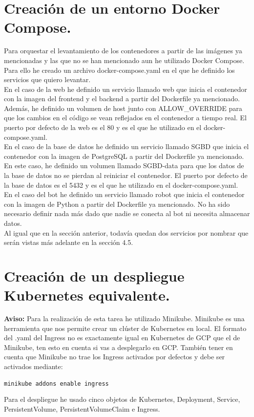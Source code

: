 \documentclass{report}
\begin{document}
        \section{Creación de un entorno Docker Compose.}
            Para orquestar el levantamiento de los contenedores a partir de las imágenes ya mencionadas y las que no se han mencionado aun he utilizado Docker Compose.
            Para ello he creado un archivo docker-compose.yaml en el que he definido los servicios que quiero levantar.\\

            En el caso de la web he definido un servicio llamado web que inicia el contenedor con la imagen del frontend y el backend a partir del Dockerfile ya mencionado.
            Además, he definido un volumen de host junto con ALLOW\_OVERRIDE para que los cambios en el código se vean reflejados en el contenedor a tiempo real.
            El puerto por defecto de la web es el 80 y es el que he utilizado en el docker-compose.yaml.\\
            
            En el caso de la base de datos he definido un servicio llamado SGBD que inicia el contenedor con la imagen de PostgreSQL a partir del Dockerfile ya mencionado.
            En este caso, he definido un volumen llamado SGBD-data para que los datos de la base de datos no se pierdan al reiniciar el contenedor.
            El puerto por defecto de la base de datos es el 5432 y es el que he utilizado en el docker-compose.yaml.\\
            
            En el caso del bot he definido un servicio llamado robot que inicia el contenedor con la imagen de Python a partir del Dockerfile ya mencionado.
            No ha sido necesario definir nada más dado que nadie se conecta al bot ni necesita almacenar datos.\\

            Al igual que en la sección anterior, todavía quedan dos servicios por nombrar que serán vistas más adelante en la sección 4.5.\\
        \clearpage
        \section{Creación de un despliegue Kubernetes equivalente.}
            \textbf{Aviso:} Para la realización de esta tarea he utilizado Minikube. Minikube es una herramienta que nos permite crear un clúster de Kubernetes en local. El formato del .yaml del Ingress no es exactamente igual en Kubernetes de GCP que el de Minikube, ten esto en cuenta si vas a desplegarlo en GCP. También tener en cuenta que Minikube no trae los Ingress activados por defectos y debe ser activados mediante:
            \begin{center}
                \texttt{minikube addons enable ingress}
            \end{center}
            Para el despliegue he usado cinco objetos de Kubernetes, Deployment, Service, PersistentVolume, PersistentVolumeClaim e Ingress.\\
\end{document}
